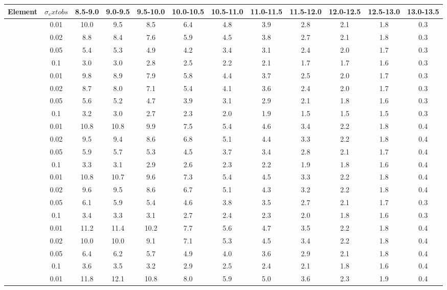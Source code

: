 \begin{tabular}{cccccccccccc}
\hline\hline
Element & $\sigma_	ext{obs}$  & 8.5-9.0 & 9.0-9.5 & 9.5-10.0 & 10.0-10.5 & 10.5-11.0 & 11.0-11.5 & 11.5-12.0 & 12.0-12.5 & 12.5-13.0 & 13.0-13.5 \\
\hline
[C/H] & 0.01 & 10.0 & 9.5 & 8.5 & 6.4 & 4.8 & 3.9 & 2.8 & 2.1 & 1.8 & 0.3 \\
 & 0.02 & 8.8 & 8.4 & 7.6 & 5.9 & 4.5 & 3.8 & 2.7 & 2.1 & 1.8 & 0.3 \\
 & 0.05 & 5.4 & 5.3 & 4.9 & 4.2 & 3.4 & 3.1 & 2.4 & 2.0 & 1.7 & 0.3 \\
 & 0.1 & 3.0 & 3.0 & 2.8 & 2.5 & 2.2 & 2.1 & 1.7 & 1.7 & 1.6 & 0.3 \\
\hline
[N/H] & 0.01 & 9.8 & 8.9 & 7.9 & 5.8 & 4.4 & 3.7 & 2.5 & 2.0 & 1.7 & 0.3 \\
 & 0.02 & 8.7 & 8.0 & 7.1 & 5.4 & 4.1 & 3.6 & 2.4 & 2.0 & 1.7 & 0.3 \\
 & 0.05 & 5.6 & 5.2 & 4.7 & 3.9 & 3.1 & 2.9 & 2.1 & 1.8 & 1.6 & 0.3 \\
 & 0.1 & 3.2 & 3.0 & 2.7 & 2.3 & 2.0 & 1.9 & 1.5 & 1.5 & 1.5 & 0.3 \\
\hline
[O/H] & 0.01 & 10.8 & 10.8 & 9.9 & 7.5 & 5.4 & 4.6 & 3.4 & 2.2 & 1.8 & 0.4 \\
 & 0.02 & 9.5 & 9.4 & 8.6 & 6.8 & 5.1 & 4.4 & 3.3 & 2.2 & 1.8 & 0.4 \\
 & 0.05 & 5.9 & 5.7 & 5.3 & 4.5 & 3.7 & 3.4 & 2.8 & 2.1 & 1.7 & 0.4 \\
 & 0.1 & 3.3 & 3.1 & 2.9 & 2.6 & 2.3 & 2.2 & 1.9 & 1.8 & 1.6 & 0.4 \\
\hline
[Ne/H] & 0.01 & 10.8 & 10.7 & 9.6 & 7.3 & 5.4 & 4.5 & 3.3 & 2.2 & 1.8 & 0.4 \\
 & 0.02 & 9.6 & 9.5 & 8.6 & 6.7 & 5.1 & 4.3 & 3.2 & 2.2 & 1.8 & 0.4 \\
 & 0.05 & 6.1 & 5.9 & 5.4 & 4.6 & 3.8 & 3.5 & 2.7 & 2.1 & 1.7 & 0.3 \\
 & 0.1 & 3.4 & 3.3 & 3.1 & 2.7 & 2.4 & 2.3 & 2.0 & 1.8 & 1.6 & 0.3 \\
\hline
[Mg/H] & 0.01 & 11.2 & 11.4 & 10.2 & 7.7 & 5.6 & 4.7 & 3.5 & 2.2 & 1.8 & 0.4 \\
 & 0.02 & 10.0 & 10.0 & 9.1 & 7.1 & 5.3 & 4.5 & 3.4 & 2.2 & 1.8 & 0.4 \\
 & 0.05 & 6.4 & 6.2 & 5.7 & 4.9 & 4.0 & 3.6 & 2.9 & 2.1 & 1.8 & 0.4 \\
 & 0.1 & 3.6 & 3.5 & 3.2 & 2.9 & 2.5 & 2.4 & 2.1 & 1.8 & 1.6 & 0.4 \\
\hline
[Al/H] & 0.01 & 11.8 & 12.1 & 10.8 & 8.0 & 5.9 & 5.0 & 3.6 & 2.3 & 1.9 & 0.4 \\

\end{tabular}
